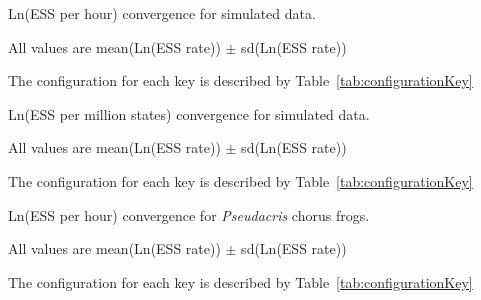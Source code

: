 \documentclass[12pt]{article}
\begin{document}
\begin{landscape}

\begin{table}[htb!]
\centering
\caption{Ln(ESS per hour) convergence for simulated data.}
\label{tab:simulatedPerHour}
\begin{threeparttable}
\begin{adjustbox}{center}
\renewcommand{\arraystretch}{1.5}
\tiny

\end{adjustbox}
\begin{tablenotes}
\tiny
\item All values are mean(Ln(ESS rate)) $\pm$ sd(Ln(ESS rate))
\item The configuration for each key is described by Table~\ref{tab:configurationKey}
\end{tablenotes}
\end{threeparttable}
\end{table}

\clearpage

\begin{table}[htb!]
\centering
\caption{Ln(ESS per million states) convergence for simulated data.}
\label{tab:simulatedPerMstates}
\begin{threeparttable}
\begin{adjustbox}{center}
\renewcommand{\arraystretch}{1.5}
\tiny

\end{adjustbox}
\begin{tablenotes}
\tiny
\item All values are mean(Ln(ESS rate)) $\pm$ sd(Ln(ESS rate))
\item The configuration for each key is described by Table~\ref{tab:configurationKey}
\end{tablenotes}
\end{threeparttable}
\end{table}

\clearpage

\begin{table}[htb!]
\centering
\caption{Ln(ESS per hour) convergence for \textit{Pseudacris} chorus frogs.}
\label{tab:pseudacrisPerHour}
\begin{threeparttable}
\begin{adjustbox}{center}
\renewcommand{\arraystretch}{1.5}
\tiny

\end{adjustbox}
\begin{tablenotes}
\tiny
\item All values are mean(Ln(ESS rate)) $\pm$ sd(Ln(ESS rate))
\item The configuration for each key is described by Table~\ref{tab:configurationKey}
\end{tablenotes}
\end{threeparttable}
\end{table}


\end{landscape}
\end{document}
